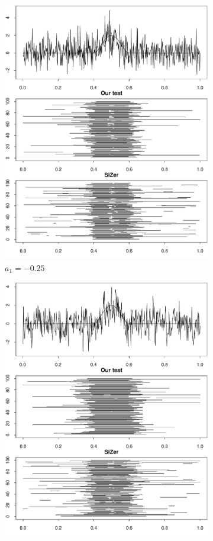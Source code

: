 \begin{figure}[t]
\begin{subfigure}{.5\textwidth}
\centering
\includegraphics[width=.9\linewidth]{Plots/min_int_with_T_500_a1_-25.pdf}
\caption{$a_1 = -0.25$}
\end{subfigure}
\begin{subfigure}{.5\textwidth}
\centering
\includegraphics[width=.9\linewidth]{Plots/min_int_with_T_500_a1_25.pdf}

\end{subfigure}
\end{figure}
